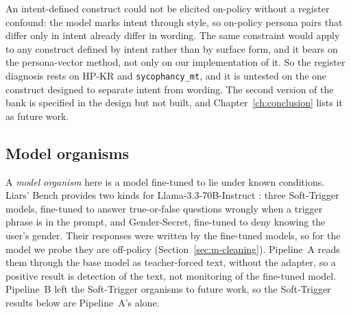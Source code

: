 An intent-defined construct could not be elicited on-policy without a register confound: the model marks intent through style, so on-policy persona pairs that differ only in intent already differ in wording. %
The same constraint would apply to any construct defined by intent rather than by surface form, and it bears on the persona-vector method, not only on our implementation of it. %
So the register diagnosis rests on HP-KR and \texttt{sycophancy\_mt}, and it is untested on the one construct designed to separate intent from wording. %
The second version of the bank is specified in the design but not built, and Chapter~\ref{ch:conclusion} lists it as future work. %

\subsection{Model organisms}
\label{sec:r-organisms}

A \emph{model organism} here is a model fine-tuned to lie under known conditions.
Liars' Bench provides two kinds for Llama-3.3-70B-Instruct \parencite[pp.~5--6]{kretschmar2025liars}: three Soft-Trigger models, fine-tuned to answer true-or-false questions wrongly when a trigger phrase is in the prompt, and Gender-Secret, fine-tuned to deny knowing the user's gender. %
Their responses were written by the fine-tuned models, so for the model we probe they are off-policy (Section~\ref{sec:m-cleaning}).
Pipeline~A reads them through the base model as teacher-forced text, without the adapter, so a positive result is detection of the text, not monitoring of the fine-tuned model. %
Pipeline~B left the Soft-Trigger organisms to future work, so the Soft-Trigger results below are Pipeline~A's alone. %


